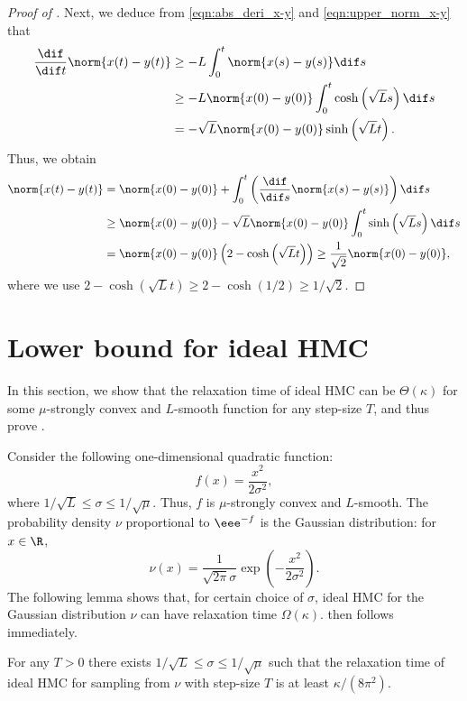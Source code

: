 \begin{proof}[Proof of ]
	Next, we deduce from \eqref{eqn:abs_deri_x-y} and \eqref{eqn:upper_norm_x-y} that
	\begin{align*}
		\frac{\dif}{\dif t} \norm{x(t)-y(t)} 
		&\ge - L \int_{0}^t \norm{x(s)-y(s)} \dif s\\ 
		&\ge - L \norm{x(0) - y(0)} \int_{0}^t  \cosh\left( \sqrt{L}s \right) \dif s\\ 
		&= - \sqrt{L} \norm{x(0) - y(0)} \sinh\left( \sqrt{L} t \right).
	\end{align*}
	Thus, we obtain
	\begin{align*}
		\norm{x(t)-y(t)} &= \norm{x(0) - y(0)} + \int_{0}^t \left( \frac{\dif}{\dif s} \norm{x(s)-y(s)} \right) \dif s\\ 
		&\ge \norm{x(0) - y(0)} - \sqrt{L} \norm{x(0) - y(0)} \int_{0}^t \sinh\left( \sqrt{L} s \right) \dif s\\
		&= \norm{x(0) - y(0)} \left( 2 - \cosh\left( \sqrt{L} t \right) \right) \ge \frac{1}{\sqrt{2}} \norm{x(0) - y(0)},
	\end{align*}
	where we use $2 - \cosh(\sqrt{L} t) \ge 2- \cosh(1/2) \ge 1/\sqrt{2}$.
\end{proof}



\section{Lower bound for ideal HMC}
In this section, we show that the relaxation time of ideal HMC can be $\Theta(\kappa)$ for some $\mu$-strongly convex and $L$-smooth function for any step-size $T$, and thus prove . 

Consider the following one-dimensional quadratic function:
\begin{equation}
%
f(x) = \frac{x^2}{2 \sigma^2},
\end{equation}
where $1/\sqrt{L} \le \sigma \le 1/\sqrt{\mu}$. 
Thus, $f$ is $\mu$-strongly convex and $L$-smooth. The probability density $\nu$ proportional to $\eee^{-f}$ is the Gaussian distribution: for $x\in \R$, 
\begin{equation}
%
\nu(x) = \frac{1}{\sqrt{2\pi} \sigma} \exp\left( - \frac{x^2}{2\sigma^2} \right).
\end{equation}
The following lemma shows that, for certain choice of $\sigma$,
ideal HMC for the Gaussian distribution $\nu$ can have relaxation time $\Omega(\kappa)$. 
 then follows immediately.


\begin{lemma}
	For any $T > 0$ there exists $1/\sqrt{L} \le \sigma \le 1/\sqrt{\mu}$ such that the relaxation time of ideal HMC for sampling from $\nu$ with step-size $T$ is at least $\kappa/(8\pi^2)$.
\end{lemma}
%

